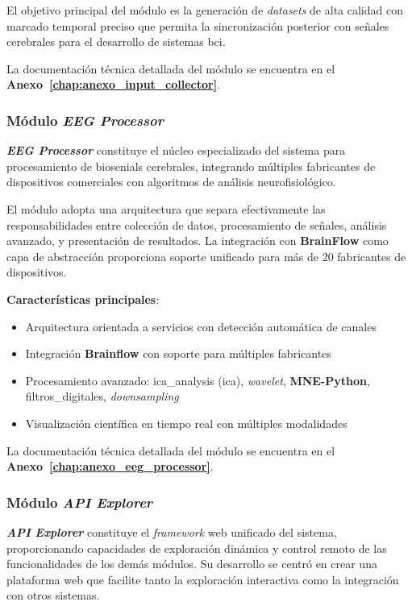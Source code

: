 El objetivo principal del módulo es la generación de \textit{\glspl{dataset}} de alta calidad con marcado temporal preciso que permita la sincronización posterior con señales cerebrales para el desarrollo de sistemas \acrshort{bci}.

La documentación técnica detallada del módulo se encuentra en el \textbf{Anexo~\ref{chap:anexo_input_collector}}.

\subsubsection{Módulo \textit{EEG Processor}}
\label{subsubsec:modulo_eeg_processor}

\textit{\textbf{EEG Processor}} constituye el núcleo especializado del sistema para procesamiento de \glspl{biosenial} cerebrales, integrando múltiples fabricantes de dispositivos comerciales con algoritmos de análisis neurofisiológico.

El módulo adopta una arquitectura que separa efectivamente las responsabilidades entre colección de datos, procesamiento de señales, análisis avanzado, y presentación de resultados. La integración con \textbf{BrainFlow} como capa de abstracción proporciona soporte unificado para más de 20 fabricantes de dispositivos.

\textbf{Características principales}:
\begin{itemize}
    \item Arquitectura orientada a servicios con detección automática de canales
    \item Integración \textbf{Brainflow} con soporte para múltiples fabricantes
    \item Procesamiento avanzado: \gls{ica_analysis} (\acrshort{ica}), \textit{\gls{wavelet}}, \textbf{MNE-Python}, \gls{filtros_digitales}, \textit{\gls{downsampling}}
    \item Visualización científica en tiempo real con múltiples modalidades
\end{itemize}

La documentación técnica detallada del módulo se encuentra en el \textbf{Anexo~\ref{chap:anexo_eeg_processor}}.

\subsubsection{Módulo \textit{API Explorer}}
\label{subsubsec:modulo_api_explorer}

\textit{\textbf{API Explorer}} constituye el \textit{\gls{framework}} web unificado del sistema, proporcionando capacidades de exploración dinámica y control remoto de las funcionalidades de los demás módulos. Su desarrollo se centró en crear una plataforma web que facilite tanto la exploración interactiva como la integración con otros sistemas.

